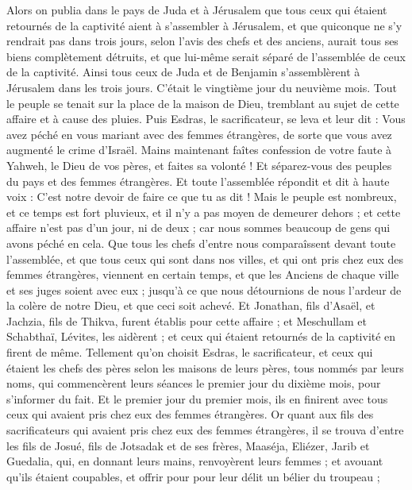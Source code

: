 \begin{multicols}{2}
Alors on publia dans le pays de Juda et à Jérusalem que tous ceux qui étaient retournés de la captivité aient à s'assembler à Jérusalem,
et que quiconque ne s'y rendrait pas dans trois jours, selon l'avis des chefs et des anciens, aurait tous ses biens complètement détruits, et que lui-même serait séparé de l'assemblée de ceux de la captivité.
Ainsi tous ceux de Juda et de Benjamin s'assemblèrent à Jérusalem dans les trois jours. C’était le vingtième jour du neuvième mois. Tout le peuple se tenait sur la place de la maison de Dieu, tremblant au sujet de cette affaire et à cause des pluies.
Puis Esdras, le sacrificateur, se leva et leur dit : Vous avez péché en vous mariant avec des femmes étrangères, de sorte que vous avez augmenté le crime d'Israël.
Mains maintenant faîtes confession de votre faute à Yahweh, le Dieu de vos pères, et faites sa volonté ! Et séparez-vous des peuples du pays et des femmes étrangères.
Et toute l'assemblée répondit et dit à haute voix : C'est notre devoir de faire ce que tu as dit !
Mais le peuple est nombreux, et ce temps est fort pluvieux, et il n'y a pas moyen de demeurer dehors ; et cette affaire n’est pas d’un jour, ni de deux ; car nous sommes beaucoup de gens qui avons péché en cela.
Que tous les chefs d'entre nous comparaîssent devant toute l'assemblée, et que tous ceux qui sont dans nos villes, et qui ont pris chez eux des femmes étrangères, viennent en certain temps, et que les Anciens de chaque ville et ses juges soient avec eux ; jusqu’à ce que nous détournions de nous l’ardeur de la colère de notre Dieu, et que ceci soit achevé.
Et Jonathan, fils d'Asaël, et Jachzia, fils de Thikva, furent établis pour cette affaire ; et Meschullam et Schabthaï, Lévites, les aidèrent ;
et ceux qui étaient retournés de la captivité en firent de même. Tellement qu'on choisit Esdras, le sacrificateur, et ceux qui étaient les chefs des pères selon les maisons de leurs pères, tous nommés par leurs noms, qui commencèrent leurs séances le premier jour du dixième mois, pour s’informer du fait.
Et le premier jour du premier mois, ils en finirent avec tous ceux qui avaient pris chez eux des femmes étrangères.
Or quant aux fils des sacrificateurs qui avaient pris chez eux des femmes étrangères, il se trouva d’entre les fils de Josué, fils de Jotsadak et de ses frères, Maaséja, Eliézer, Jarib et Guedalia,
qui, en donnant leurs mains, renvoyèrent leurs femmes ; et avouant qu’ils étaient coupables, et offrir pour pour leur délit un bélier du troupeau ;

\end{multicols}
